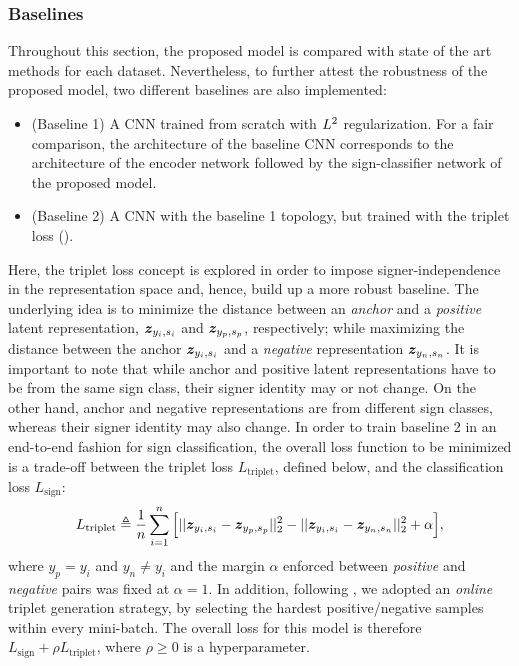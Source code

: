 \subsubsection{Baselines}
Throughout this section, the proposed model is compared with state of the art methods for each dataset. Nevertheless, to further attest the robustness of the proposed model, two different baselines are also implemented:
\begin{itemize}
    \item (Baseline 1) A CNN trained from scratch with $L^2$ regularization. For a fair comparison, the architecture of the baseline CNN corresponds to the architecture of the encoder network followed by the sign-classifier network of the proposed model.
    \item (Baseline 2) A CNN with the baseline 1 topology, but trained with the triplet loss (\citet{Schroff2015}).
\end{itemize}
Here, the triplet loss concept is explored in order to impose signer-independence in the representation space and, hence, build up a more robust baseline. The underlying idea is to minimize the distance between an \textit{anchor} and a \textit{positive} latent representation, ${\bm{z}}_{y_{i}, s_{i}}$ and ${\bm{z}}_{y_{p}, s_{p}}$, respectively; while maximizing the distance between the anchor ${\bm{z}}_{y_{i}, s_{i}}$ and a \textit{negative} representation ${\bm{z}}_{y_{n}, s_{n}}$. It is important to note that while anchor and positive latent representations have to be from the same sign class, their signer identity may or not change. On the other hand, anchor and negative representations are from different sign classes, whereas their signer identity may also change. In order to train baseline 2 in an end-to-end fashion for sign classification, the overall loss function to be minimized is a trade-off between the triplet loss $L_{\text{triplet}}$, defined below, and the classification loss $L_{\text{sign}}$:
\begin{equation}
L_{\text{triplet}} \triangleq \frac{1}{n}\sum_{i=1}^{n}\Big[||{\bm{z}}_{y_{i}, s_{i}}-{\bm{z}}_{y_{p}, s_{p}}||^2_2 - ||{\bm{z}}_{y_{i}, s_{i}}-{\bm{z}}_{y_{n}, s_{n}}||^2_2 + \alpha\Big],
\end{equation}
where $y_{p}=y_{i}$ and $y_{n} \neq y_{i}$ and the margin $\alpha$ enforced between \emph{positive} and \emph{negative} pairs was fixed at $\alpha=1$. In addition, following \citet{Schroff2015}, we adopted an \emph{online} triplet generation strategy, by selecting the hardest positive/negative samples within every mini-batch. The overall loss for this model is therefore $L_{\text{sign}} + \rho L_{\text{triplet}}$, where $\rho \geq 0$ is a hyperparameter.

